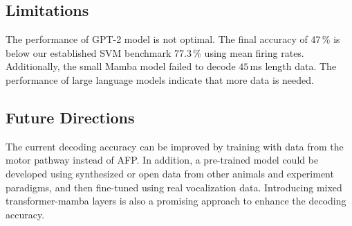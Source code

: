 \documentclass[../CLthesis.tex]{subfiles}
\begin{document}
\subsection{Limitations}
The performance of GPT-2 model is not optimal. The final accuracy of 47\,\% is below our established SVM benchmark 77.3\,\% using mean firing rates. Additionally, the small Mamba model failed to decode $45$\,ms length data. The performance of large language models indicate that more data is needed.

\subsection{Future Directions}
The current decoding accuracy can be improved by training with data from the motor pathway instead of AFP. In addition, a pre-trained model could be developed using synthesized \citep{Zhou2020-om} or open \citep{de-Vries2020-ld} data from other animals and experiment paradigms, and then fine-tuned using real vocalization data. Introducing mixed transformer-mamba layers \citep{Lieber2024-hk} is also a promising approach to enhance the decoding accuracy.



\subfilebibliography
\end{document}
